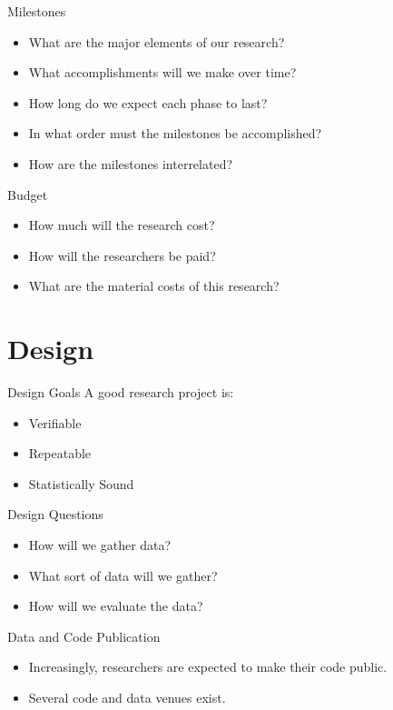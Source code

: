 \documentclass[handout]{beamer}
\begin{document}
\begin{frame}{Milestones}
    \begin{itemize}
        \item What are the major elements of our research?
        \item What accomplishments will we make over time?
        \item How long do we expect each phase to last?
        \item In what order must the milestones be accomplished?
        \item How are the milestones interrelated?
    \end{itemize}
\end{frame}

\begin{frame}{Budget}
    \begin{itemize}
        \item How much will the research cost?
        \item How will the researchers be paid?
        \item What are the material costs of this research?
    \end{itemize}
\end{frame}

\section{Design}

\begin{frame}{Design Goals}
    A good research project is:
    \begin{itemize}
        \item Verifiable
        \item Repeatable
        \item Statistically Sound
    \end{itemize}
\end{frame}

\begin{frame}{Design Questions}
    \begin{itemize}
        \item How will we gather data?
        \item What sort of data will we gather?
        \item How will we evaluate the data?
    \end{itemize}
\end{frame}

\begin{frame}{Data and Code Publication}
    \begin{itemize}
        \item Increasingly, researchers are expected to make their code public.
        \item Several code and data venues exist.
    \end{itemize}
\end{frame}
\end{document}
